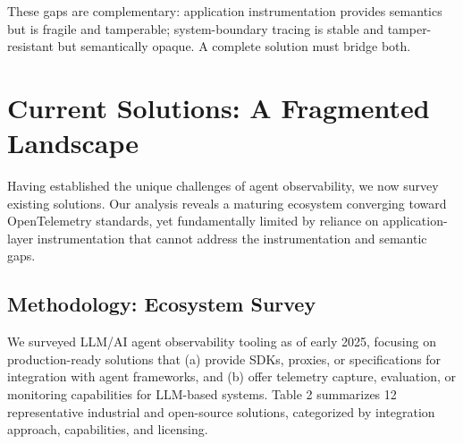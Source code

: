 \documentclass[sigplan,screen,9pt]{acmart}
\begin{document}
These gaps are complementary: application instrumentation provides semantics but is fragile and tamperable; system-boundary tracing is stable and tamper-resistant but semantically opaque. A complete solution must bridge both.

\section{Current Solutions: A Fragmented Landscape}

Having established the unique challenges of agent observability, we now survey existing solutions. Our analysis reveals a maturing ecosystem converging toward OpenTelemetry standards, yet fundamentally limited by reliance on application-layer instrumentation that cannot address the instrumentation and semantic gaps.

\subsection{Methodology: Ecosystem Survey}

We surveyed LLM/AI agent observability tooling as of early 2025, focusing on production-ready solutions that (a) provide SDKs, proxies, or specifications for integration with agent frameworks, and (b) offer telemetry capture, evaluation, or monitoring capabilities for LLM-based systems. Table 2 summarizes 12 representative industrial and open-source solutions, categorized by integration approach, capabilities, and licensing.
\end{document}
